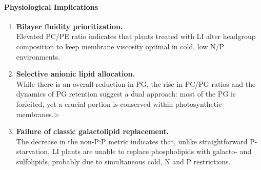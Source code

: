 \documentclass[10pt,letterpaper]{article}
\begin{document}
\paragraph{Physiological Implications}
\begin{enumerate}
  \item \textbf{Bilayer fluidity prioritization.}  \\
        Elevated PC/PE ratio indicates that plants treated with LI alter headgroup composition to keep membrane viscosity optimal in cold, low N/P environments.
  
  \item \textbf{Selective anionic lipid allocation.}  \\
        While there is an overall reduction in PG, the rise in PC/PG ratios and the dynamics of PG retention suggest a dual approach: most of the PG is forfeited, yet a crucial portion is conserved within photosynthetic membranes.> 
  
  \item \textbf{Failure of classic galactolipid replacement.}  \\
        The decrease in the non-P:P metric indicates that, unlike straightforward P-starvation, LI plants are unable to replace phospholipids with galacto- and sulfolipids, probably due to simultaneous cold, N and P restrictions.
\end{enumerate}

\end{document}
